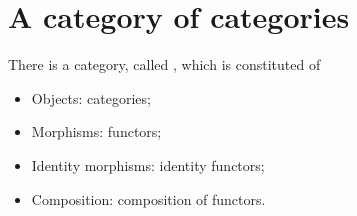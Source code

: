 \section{A category of categories}


\begin{ctdefinition}
  There is a category, called \Category, which is constituted of
  \begin{itemize}
    \item Objects: categories;
    \item Morphisms: functors;
    \item Identity morphisms: identity functors;
    \item Composition: composition of functors.
  \end{itemize}
\end{ctdefinition}
